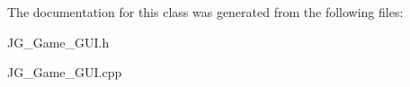 The documentation for this class was generated from the following files\-:\begin{DoxyCompactItemize}
\item 
J\-G\-\_\-\-Game\-\_\-\-G\-U\-I.\-h\item 
J\-G\-\_\-\-Game\-\_\-\-G\-U\-I.\-cpp\end{DoxyCompactItemize}
